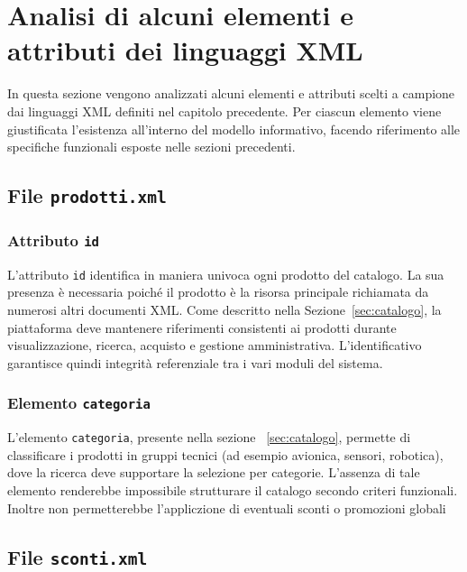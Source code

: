 \documentclass[a4paper,12pt]{report}
\begin{document}


\section{Analisi di alcuni elementi e attributi dei linguaggi XML}
\label{sec:analisi-xml}

In questa sezione vengono analizzati alcuni elementi e attributi scelti a 
campione dai linguaggi XML definiti nel capitolo precedente.  
Per ciascun elemento viene giustificata l’esistenza all’interno del modello 
informativo, facendo riferimento alle specifiche funzionali esposte nelle sezioni
precedenti.

\subsection{File \texttt{prodotti.xml}}

\subsubsection*{Attributo \texttt{id}}
L’attributo \texttt{id} identifica in maniera univoca ogni prodotto del catalogo.  
La sua presenza è necessaria poiché il prodotto è la risorsa principale 
richiamata da numerosi altri documenti XML.  
Come descritto nella Sezione~\ref{sec:catalogo}, la piattaforma deve 
mantenere riferimenti consistenti ai prodotti durante visualizzazione, ricerca, 
acquisto e gestione amministrativa.  
L’identificativo garantisce quindi integrità referenziale tra i vari moduli del sistema.

\subsubsection*{Elemento \texttt{categoria}}
L’elemento \texttt{categoria}, presente nella sezione ~\ref{sec:catalogo}, permette di classificare i prodotti in gruppi tecnici (ad esempio avionica, sensori, robotica), dove la ricerca deve supportare la selezione per categorie.  
L’assenza di tale elemento renderebbe impossibile strutturare il catalogo secondo criteri funzionali. Inoltre non permetterebbe l'appliczione di eventuali sconti o promozioni globali


\subsection{File \texttt{sconti.xml}}
\end{document}
